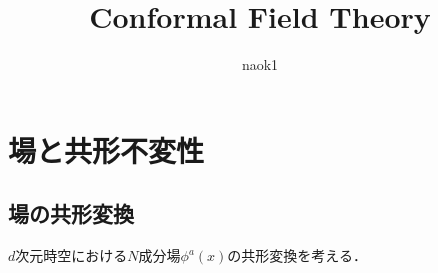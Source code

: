 \documentclass[dvipdfmx,uplatex,b5paper,9pt]{jsreport}
\title{Conformal Field Theory}
\author{naok1} %
\theoremstyle{definition}
\theoremstyle{definition}
\theoremstyle{definition}
\theoremstyle{definition}
\theoremstyle{definition}
\theoremstyle{definition}
\theoremstyle{definition}
\theoremstyle{definition}
\theoremstyle{definition}
\begin{document}
\maketitle
\tableofcontents


\chapter{場と共形不変性}
\section{場の共形変換}
\(d\)次元時空における\(N\)成分場\(\phi^{a}(x)\)の共形変換を考える．



\end{document}
